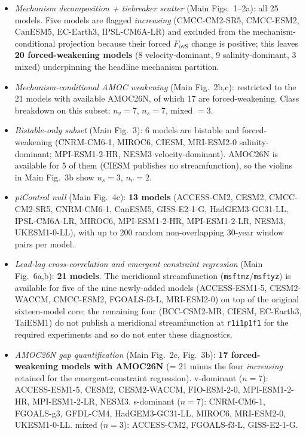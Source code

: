 \documentclass[10pt,a4paper]{article}
\newcommand{\Fovs}{F_{\mathrm{ovS}}}
\begin{document}
\begin{itemize}
\item \emph{Mechanism decomposition + tiebreaker scatter} (Main Figs.~1--2a): all 25 models. Five models are flagged \emph{increasing} (CMCC-CM2-SR5, CMCC-ESM2, CanESM5, EC-Earth3, IPSL-CM6A-LR) and excluded from the mechanism-conditional projection because their forced $\Fovs$ change is positive; this leaves \textbf{20 forced-weakening models} (8 velocity-dominant, 9 salinity-dominant, 3 mixed) underpinning the headline mechanism partition.
\item \emph{Mechanism-conditional AMOC weakening} (Main Fig.~2b,c): restricted to the 21 models with available AMOC26N, of which 17 are forced-weakening. Class breakdown on this subset: $n_v = 7$, $n_s = 7$, mixed $= 3$.
\item \emph{Bistable-only subset} (Main Fig.~3): 6 models are bistable and forced-weakening (CNRM-CM6-1, MIROC6, CIESM, MRI-ESM2-0 salinity-dominant; MPI-ESM1-2-HR, NESM3 velocity-dominant). AMOC26N is available for 5 of them (CIESM publishes no streamfunction), so the violins in Main Fig.~3b show $n_s = 3$, $n_v = 2$.
\item \emph{piControl null} (Main Fig.~4c): \textbf{13 models} (ACCESS-CM2, CESM2, CMCC-CM2-SR5, CNRM-CM6-1, CanESM5, GISS-E2-1-G, HadGEM3-GC31-LL, IPSL-CM6A-LR, MIROC6, MPI-ESM1-2-HR, MPI-ESM1-2-LR, NESM3, UKESM1-0-LL), with up to 200 random non-overlapping 30-year window pairs per model.
\item \emph{Lead-lag cross-correlation and emergent constraint regression} (Main Fig.~6a,b): \textbf{21 models}. The meridional streamfunction (\texttt{msftmz}/\texttt{msftyz}) is available for five of the nine newly-added models (ACCESS-ESM1-5, CESM2-WACCM, CMCC-ESM2, FGOALS-f3-L, MRI-ESM2-0) on top of the original sixteen-model core; the remaining four (BCC-CSM2-MR, CIESM, EC-Earth3, TaiESM1) do not publish a meridional streamfunction at \texttt{r1i1p1f1} for the required experiments and so do not enter these diagnostics.

\item \emph{AMOC26N gap quantification} (Main Fig.~2c, Fig.~3b): \textbf{17 forced-weakening models with AMOC26N} (= 21 minus the four \emph{increasing} retained for the emergent-constraint regression). v-dominant ($n=7$): ACCESS-ESM1-5, CESM2, CESM2-WACCM, FIO-ESM-2-0, MPI-ESM1-2-HR, MPI-ESM1-2-LR, NESM3. s-dominant ($n=7$): CNRM-CM6-1, FGOALS-g3, GFDL-CM4, HadGEM3-GC31-LL, MIROC6, MRI-ESM2-0, UKESM1-0-LL. mixed ($n=3$): ACCESS-CM2, FGOALS-f3-L, GISS-E2-1-G.
\end{itemize}
\end{document}
